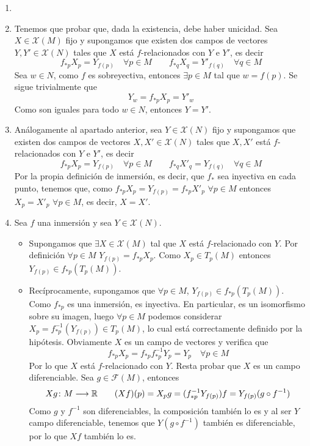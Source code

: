 \documentclass[twoside]{article}
\begin{document}
\begin{solucion}
\begin{enumerate}
\item[]
\item Tenemos que probar que, dada la existencia, debe haber unicidad. Sea $X\in\mathcal{X}(M)$ fijo y supongamos que existen dos campos de vectores $Y,Y'\in \mathcal{X}(N)$ tales que $X$ está $f$-relacionados con $Y$ e $Y'$, es decir
$$f_{\ast p}X_p = Y_{f(p)} \quad \forall p\in M \qquad
f_{\ast q}X_q = Y'_{f(q)} \quad \forall q\in M $$ 
Sea $w\in N$, como $f$ es sobreyectiva, entonces $\exists p \in M$ tal que $w=f(p)$. Se sigue trivialmente que
$$
Y_w = f_{\ast p}X_p = Y'_w
$$
Como son iguales para todo $w\in N$, entonces $Y=Y'$.
\item Análogamente al apartado anterior, sea $Y\in\mathcal{X}(N)$ fijo y supongamos que existen dos campos de vectores $X,X'\in \mathcal{X}(N)$ tales que $X,X'$ está $f$-relacionados con $Y$ e $Y'$, es decir
$$f_{\ast p}X_p = Y_{f(p)} \quad \forall p\in M \qquad
f_{\ast q}X'_q = Y_{f(q)} \quad \forall q\in M $$ 
Por la propia definición de inmersión, es decir, que $f_{\ast}$ sea inyectiva en cada punto, tenemos que, como $f_{\ast p}X_p = Y_{f(p)} = f_{\ast p}X'_p$ $\forall p\in M$ entonces $ X_p = X'_p$ $\forall p\in M$, es decir, $X=X'$.
\item Sea $f$ una inmersión y sea $Y \in \mathcal{X}(N)$.
\begin{itemize}
\item Supongamos que $\exists X \in \mathcal{X}(M)$ tal que $X$ está $f$-relacionado con $Y$. Por definición $\forall p\in M$ $Y_{f(p)}=f_{\ast p}X_p$. Como $X_p\in T_p(M)$ entonces ${Y_{f(p)}\in f_{\ast p}(T_p(M))}$.
\item Recíprocamente, supongamos que $\forall p \in M$, $Y_{f(p)}\in f_{\ast p}(T_p(M))$. Como $f_{\ast p}$ es una inmersión, es inyectiva. En particular, es un isomorfismo sobre su imagen, luego $\forall p\in M$ podemos considerar $X_p = f_{\ast p}^{-1}(Y_{f(p)})\in T_p(M)$, lo cual está correctamente definido por la hipótesis. Obviamente $X$ es un campo de vectores y verifica que
$$f_{\ast p} X_p = f_{\ast p} f_{\ast p}^{-1} Y_p = Y_p \quad \forall p \in M$$
Por lo que $X$ está $f$-relacionado con $Y$. Resta probar que $X$ es un campo diferenciable. Sea $g \in \mathcal{F}(M)$, entonces 
$$
X g \colon{M}\longrightarrow{\mathbb{R}} \qquad (Xf)(p) = X_p g = (f_{\ast p}^{-1} Y_{f(p)})f = Y_{f(p)}(g \circ f^{-1})
$$
Como $g$ y $f^{-1}$ son diferenciables, la composición también lo es y al ser $Y$ campo diferenciable, tenemos que $Y(g\circ f^{-1})$ también es diferenciable, por lo que $Xf$ también lo es.
\end{itemize} 
\end{enumerate}
\end{solucion}
\end{document}
